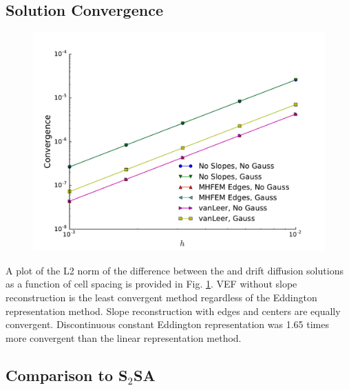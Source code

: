 \subsection{Solution Convergence}
\begin{figure} \centering
	\includegraphics[width=6in]{figs/hlimit.pdf}
	\caption{}
	\label{fig:hlimit}
\end{figure}
A plot of the L2 norm of the difference between the \SN and drift diffusion solutions as a function of cell spacing is provided in Fig. \ref{fig:hlimit}. VEF without slope reconstruction is the least convergent method regardless of the Eddington representation method. Slope reconstruction with edges and centers are equally convergent. Discontinuous constant Eddington representation was 1.65 times more convergent than the linear representation method. 

\subsection{Comparison to S$_2$SA}

